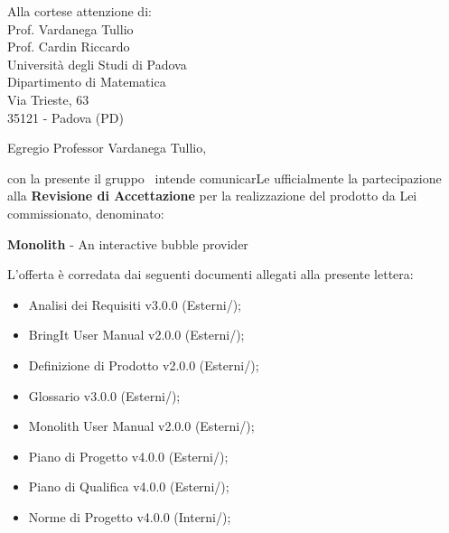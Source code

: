 


\newcommand{\logo}{../../Template/Logo/Logo.png}
\newcommand{\data}{\today}
\newcommand{\oggetto}{Partecipazione alla Revisione di Accettazione.}
\newcommand{\mittente}{Riccardo Montagnin \\ Responsabile NPE Developers}
\newcommand{\firma}{../../Template/Firme/RM.png}





\begin{letter}{Alla cortese attenzione di:  \\
 Prof. Vardanega Tullio \\
 Prof. Cardin Riccardo \\
 Università degli Studi di Padova \\
 Dipartimento di Matematica \\
 Via Trieste, 63 \\
 35121 - Padova (PD)}

\opening{Egregio Professor Vardanega Tullio,} 

con la presente il gruppo \gruppo\ intende comunicarLe ufficialmente la partecipazione alla \textbf{Revisione di Accettazione} per la realizzazione del prodotto da Lei commissionato, denominato:
\begin{center}
\textbf{Monolith} - An interactive bubble provider
\end{center}
L'offerta è corredata dai seguenti documenti allegati alla presente lettera:
\begin{itemize}
	\item Analisi dei Requisiti v3.0.0 (Esterni/\analisiDeiRequisiti);
	\item BringIt User Manual v2.0.0 (Esterni/\manualeUtenteApp);
	\item Definizione di Prodotto v2.0.0 (Esterni/);
	\item Glossario v3.0.0 (Esterni/\glossario);
	\item Monolith User Manual v2.0.0 (Esterni/\manualeUtente);
	\item Piano di Progetto v4.0.0 (Esterni/\pianoDiProgetto);
	\item Piano di Qualifica v4.0.0 (Esterni/\pianoDiQualifica);	
	\item Norme di Progetto v4.0.0 (Interni/\normeDiProgetto);	
	
\end{itemize}


\end{letter}

